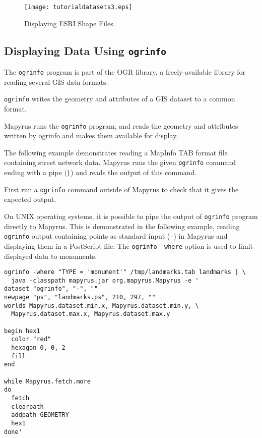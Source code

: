 

\begin{figure}[htb]
\texttt{[image: tutorialdatasets3.eps]}
\caption{Displaying ESRI Shape Files}
\label{tutorialdatasets3}
\end{figure}

\subsection{Displaying Data Using \texttt{ogrinfo}}

The \texttt{ogrinfo} program is part of the OGR library, a freely-available
library for reading several GIS data formats.

\texttt{ogrinfo} writes the geometry and attributes of a GIS dataset
to a common format.

Mapyrus runs the \texttt{ogrinfo} program, and reads the
geometry and attributes written by ogrinfo and makes them available
for display.

The following example demonstrates reading a MapInfo TAB format
file containing street network data.  Mapyrus runs the
given \texttt{ogrinfo} command ending with a pipe (\texttt{|})
and reads the output of this command.



First run a \texttt{ogrinfo} command outside of Mapyrus
to check that it gives the expected output.

On UNIX operating systems, it is possible to pipe the output of
\texttt{ogrinfo} program directly to Mapyrus.  This is demonstrated in the
following example, reading \texttt{ogrinfo} output containing points as
standard input (\texttt{-})
in Mapyrus and displaying them in a PostScript file.
The \texttt{ogrinfo -where} option is used to limit displayed
data to monuments.

\begin{verbatim}
ogrinfo -where "TYPE = 'monument'" /tmp/landmarks.tab landmarks | \
  java -classpath mapyrus.jar org.mapyrus.Mapyrus -e '
dataset "ogrinfo", "-", ""
newpage "ps", "landmarks.ps", 210, 297, ""
worlds Mapyrus.dataset.min.x, Mapyrus.dataset.min.y, \
  Mapyrus.dataset.max.x, Mapyrus.dataset.max.y

begin hex1
  color "red"
  hexagon 0, 0, 2
  fill
end

while Mapyrus.fetch.more
do
  fetch
  clearpath
  addpath GEOMETRY
  hex1
done'
\end{verbatim}

